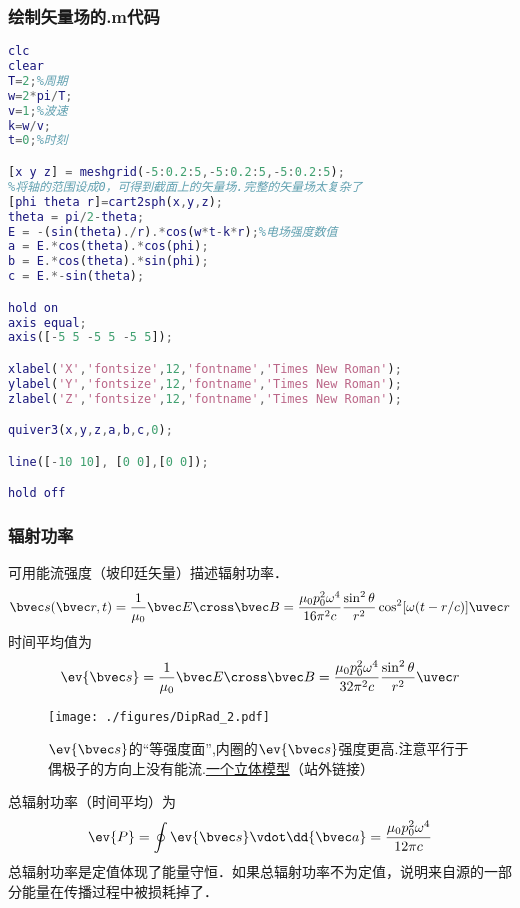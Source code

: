 \subsubsection{绘制矢量场的.m代码}
\begin{lstlisting}[language=matlab]
clc
clear
T=2;%周期
w=2*pi/T;
v=1;%波速
k=w/v;
t=0;%时刻

[x y z] = meshgrid(-5:0.2:5,-5:0.2:5,-5:0.2:5);
%将轴的范围设成0，可得到截面上的矢量场.完整的矢量场太复杂了
[phi theta r]=cart2sph(x,y,z);
theta = pi/2-theta;
E = -(sin(theta)./r).*cos(w*t-k*r);%电场强度数值
a = E.*cos(theta).*cos(phi);
b = E.*cos(theta).*sin(phi);
c = E.*-sin(theta);

hold on
axis equal;
axis([-5 5 -5 5 -5 5]);

xlabel('X','fontsize',12,'fontname','Times New Roman');
ylabel('Y','fontsize',12,'fontname','Times New Roman');
zlabel('Z','fontsize',12,'fontname','Times New Roman');

quiver3(x,y,z,a,b,c,0);

line([-10 10], [0 0],[0 0]);

hold off

\end{lstlisting}


\subsubsection{辐射功率}
可用能流强度（坡印廷矢量）描述辐射功率．
\begin{equation}
\bvec s(\bvec r, t) = \frac{1}{\mu_0} \bvec E \cross \bvec B = \frac{\mu_0p_0^2\omega^4}{16\pi^2c} \frac{\sin^2\theta}{r^2} \cos^2[\omega(t - r/c)] \uvec r
\end{equation}
时间平均值为
\begin{equation}
\ev{\bvec s} = \frac{1}{\mu_0} \bvec E \cross \bvec B
= \frac{\mu_0p_0^2\omega^4}{32\pi^2c} \frac{\sin^2\theta}{r^2} \uvec r
\end{equation}

\begin{figure}[ht]
\centering
\texttt{[image: ./figures/DipRad\_2.pdf]}
\caption{$\ev{\bvec s}$的“等强度面”,内圈的$\ev{\bvec s}$强度更高.注意平行于偶极子的方向上没有能流.\href{https://www.geogebra.org/m/semmtxm5}{一个立体模型}（站外链接）} \label{DipRad_fig2}
\end{figure}
总辐射功率（时间平均）为
\begin{equation}
\ev{P} = \oint \ev{\bvec s} \vdot \dd{\bvec a} = \frac{\mu_0 p_0^2 \omega^4}{12\pi c}
\end{equation}
总辐射功率是定值体现了能量守恒．如果总辐射功率不为定值，说明来自源的一部分能量在传播过程中被损耗掉了．
